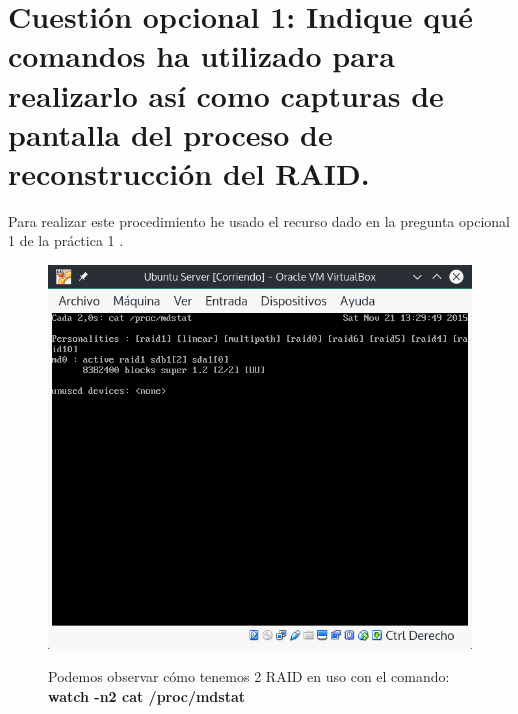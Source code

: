 
\section{Cuestión opcional 1: Indique qué comandos ha utilizado para realizarlo así como capturas de pantalla del proceso de reconstrucción del RAID.}

Para realizar este procedimiento he usado el recurso dado en la pregunta opcional 1 de la práctica 1 \cite{raid}.

\begin{figure}[H] %
	\centering
	\includegraphics[scale=0.5]{figuras/figura32.png}  %
	\label{figura32}
	
	\caption{Podemos observar cómo tenemos 2 RAID en uso con el comando: \textbf{watch -n2 cat /proc/mdstat}} 
\end{figure}

